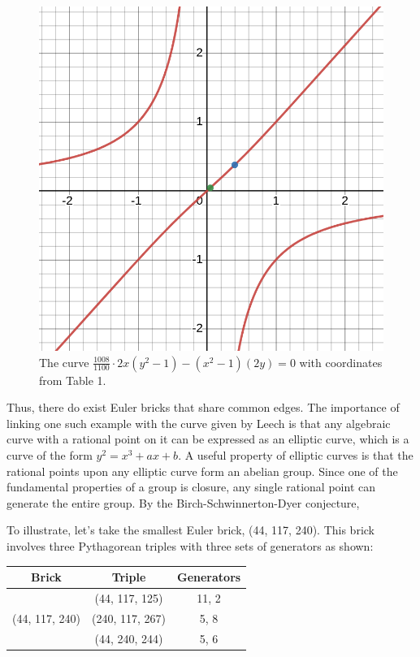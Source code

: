 \documentclass[11pt]{article}
\begin{document}
\begin{figure}[h]
	\centering
    \includegraphics[scale=0.25]{3.png}
    \caption{The curve $\frac{1008}{1100}\cdot2x(y^2-1)-(x^2-1)(2y)=0$ with coordinates from Table 1.}
\end{figure}

Thus, there do exist Euler bricks that share common edges. The importance of linking one such example with the curve given by Leech is that any algebraic curve with a rational point on it can be expressed as an elliptic curve, which is a curve of the form $y^2=x^3+ax+b$. A useful property of elliptic curves is that the rational points upon any elliptic curve form an abelian group. Since one of the fundamental properties of a group is closure, any single rational point can generate the entire group. By the Birch-Schwinnerton-Dyer conjecture, 

To illustrate, let's take the smallest Euler brick, (44, 117, 240). This brick involves three Pythagorean triples with three sets of generators as shown:

\begin{table}[H]
	\centering
	\begin{tabular}{| c | c | c |}
		\hline
		Brick & Triple & Generators\\
		\hline \hline 
		\multirow{3}{*}{(44, 117, 240)} & (44, 117, 125) & {11, 2} \\ \cline{2-3}
		& (240, 117, 267) & {5, 8}  \\ \cline{2-3}
		& (44, 240, 244) & {5, 6} \\ \hline
	\end{tabular}
\end{table}
\end{document}
